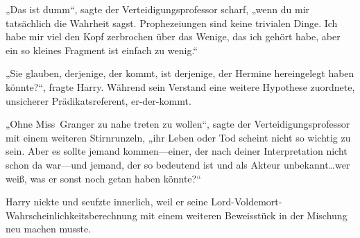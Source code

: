 „Das ist dumm“, sagte der Verteidigungsprofessor scharf, „wenn du mir tatsächlich die Wahrheit sagst. Prophezeiungen sind keine trivialen Dinge. Ich habe mir viel den Kopf zerbrochen über das Wenige, das ich gehört habe, aber ein so kleines Fragment ist einfach zu wenig.“

„Sie glauben, derjenige, der kommt, ist derjenige, der Hermine hereingelegt haben könnte?“, fragte Harry. Während sein Verstand eine weitere Hypothese zuordnete, unsicherer Prädikatsreferent, er-der-kommt.

„Ohne Miss~Granger zu nahe treten zu wollen“, sagte der Verteidigungsprofessor mit einem weiteren Stirnrunzeln, „ihr Leben oder Tod scheint nicht so wichtig zu sein. Aber es sollte jemand kommen—einer, der nach deiner Interpretation nicht schon da war—und jemand, der so bedeutend ist und als Akteur unbekannt…wer weiß, was er sonst noch getan haben könnte?“

Harry nickte und seufzte innerlich, weil er seine Lord-Voldemort-Wahrscheinlichkeitsberechnung mit einem weiteren Beweisstück in der Mischung neu machen musste.

